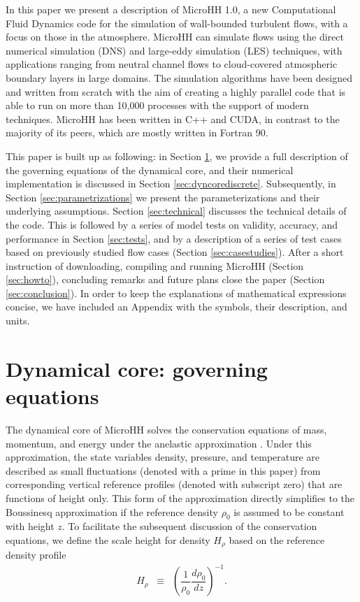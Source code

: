 \documentclass[gmd]{copernicus}
\begin{document}
\introduction  %
In this paper we present a description of MicroHH 1.0, a new Computational Fluid Dynamics code for the simulation of wall-bounded turbulent flows, with a focus on those in the atmosphere. MicroHH can simulate flows using the direct numerical simulation (DNS) and large-eddy simulation (LES) techniques, with applications ranging from neutral channel flows to cloud-covered atmospheric boundary layers in large domains. The simulation algorithms have been designed and written from scratch with the aim of creating a highly parallel code that is able to run on more than 10,000 processes with the support of modern techniques. MicroHH has been written in C++ and CUDA, in contrast to the majority of its peers, which are mostly written in Fortran 90.

This paper is built up as following: in Section \ref{sec:dyncore}, we provide a full description of the governing equations of the dynamical core, and their numerical implementation is discussed in Section \ref{sec:dyncorediscrete}. Subsequently, in Section \ref{sec:parametrizations} we present the parameterizations and their underlying assumptions. Section \ref{sec:technical} discusses the technical details of the code. This is followed by a series of model tests on validity, accuracy, and performance in Section \ref{sec:tests}, and by a description of a series of test cases based on previously studied flow cases (Section \ref{sec:casestudies}). After a short instruction of downloading, compiling and running MicroHH (Section \ref{sec:howto}), concluding remarks and future plans close the paper (Section \ref{sec:conclusion}). In order to keep the explanations of mathematical expressions concise, we have included an Appendix with the symbols, their description, and units.

\section{Dynamical core: governing equations}\label{sec:dyncore}
The dynamical core of MicroHH solves the conservation equations of mass, momentum, and energy under the anelastic approximation \citep{Bannon1996}. Under this approximation, the state variables density, pressure, and temperature are described as small fluctuations (denoted with a prime in this paper) from corresponding vertical reference profiles (denoted with subscript zero) that are functions of height only. This form of the approximation directly simplifies to the Boussinesq approximation if the reference density $\rho_0$ is assumed to be constant with height $z$. To facilitate the subsequent discussion of the conservation equations, we define the scale height for density $H_\rho$ based on the reference density profile
\begin{eqnarray}
H_{\rho} & \equiv & \left( \dfrac{1}{\rho_0} \dfrac{d \rho_0}{dz} \right)^{-1}.
\end{eqnarray}
\end{document}
